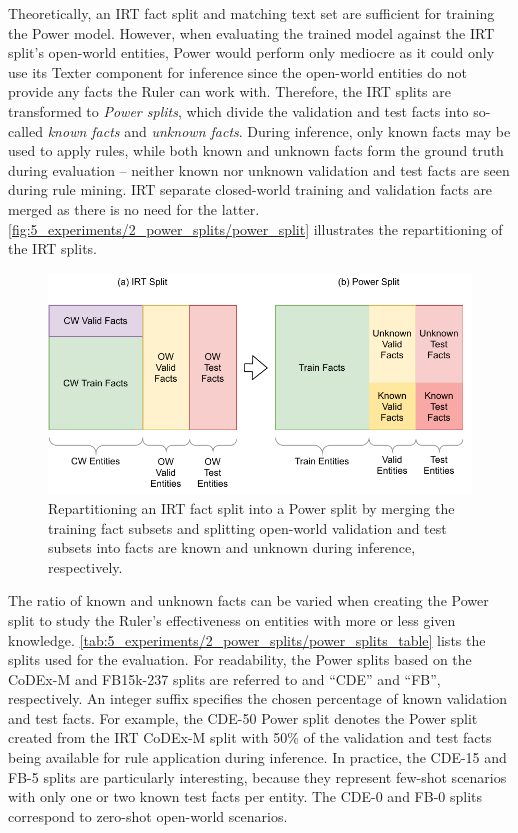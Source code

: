 Theoretically, an IRT fact split and matching text set are sufficient for training the Power model. However, when evaluating the trained model against the IRT split's open-world entities, Power would perform only mediocre as it could only use its Texter component for inference since the open-world entities do not provide any facts the Ruler can work with. Therefore, the IRT splits are transformed to \emph{Power splits}, which divide the validation and test facts into so-called \emph{known facts} and \emph{unknown facts}. During inference, only known facts may be used to apply rules, while both known and unknown facts form the ground truth during evaluation -- neither known nor unknown validation and test facts are seen during rule mining. IRT separate closed-world training and validation facts are merged as there is no need for the latter. \autoref{fig:5_experiments/2_power_splits/power_split} illustrates the repartitioning of the IRT splits.

\begin{figure}[t]
    \centering
    \includegraphics[width=\textwidth]{5_experiments/2_power_splits/power_split}
    \caption{Repartitioning an IRT fact split into a Power split by merging the training fact subsets and splitting open-world validation and test subsets into facts are known and unknown during inference, respectively.}
    \label{fig:5_experiments/2_power_splits/power_split}
\end{figure}

The ratio of known and unknown facts can be varied when creating the Power split to study the Ruler's effectiveness on entities with more or less given knowledge. \autoref{tab:5_experiments/2_power_splits/power_splits_table} lists the splits used for the evaluation. For readability, the Power splits based on the CoDEx-M and FB15k-237 splits are referred to and ``CDE'' and ``FB'', respectively. An integer suffix specifies the chosen percentage of known validation and test facts. For example, the CDE-50 Power split denotes the Power split created from the IRT CoDEx-M split with 50\% of the validation and test facts being available for rule application during inference. In practice, the CDE-15 and FB-5 splits are particularly interesting, because they represent few-shot scenarios with only one or two known test facts per entity. The CDE-0 and FB-0 splits correspond to zero-shot open-world scenarios.

